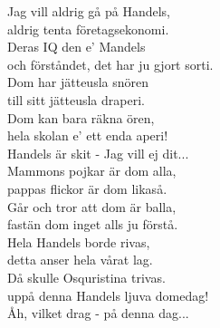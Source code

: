 \documentclass[a6paper,10pt]{article}
\begin{document}
\setlength{\oddsidemargin}{-0.47in}
\noindent
\begin{center}
\end{center}
\begin{lyrics}
Jag vill aldrig gå på Handels,\\
aldrig tenta företagsekonomi.\\
Deras IQ den e' Mandels\\
och förståndet, det har ju gjort sorti.\\
Dom har jätteusla snören\\
till sitt jätteusla draperi.\\
Dom kan bara räkna ören,\\
hela skolan e' ett enda aperi!
\vspace{5pt}\\
Handels är skit - Jag vill ej dit...
\vspace{5pt}\\
Mammons pojkar är dom alla,\\
pappas flickor är dom likaså.\\
Går och tror att dom är balla,\\
fastän dom inget alls ju förstå.\\
Hela Handels borde rivas,\\
detta anser hela vårat lag.\\
Då skulle Osquristina trivas.\\
uppå denna Handels ljuva domedag!
\vspace{5pt}\\
Åh, vilket drag - på denna dag... 
\end{lyrics}
\end{document}
